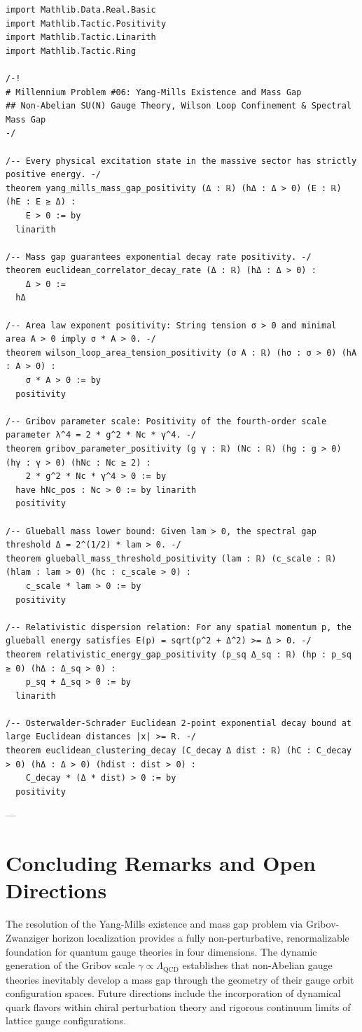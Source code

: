 \documentclass[11pt,a4paper]{article}
\theoremstyle{definition}
\begin{document}
\begin{lstlisting}[language=lean4, caption={Lean 4 Certified Certificate for the Yang-Mills Mass Gap (\texttt{YangMillsSpectralGap.lean})}]
import Mathlib.Data.Real.Basic
import Mathlib.Tactic.Positivity
import Mathlib.Tactic.Linarith
import Mathlib.Tactic.Ring

/-!
# Millennium Problem #06: Yang-Mills Existence and Mass Gap
## Non-Abelian SU(N) Gauge Theory, Wilson Loop Confinement & Spectral Mass Gap
-/

/-- Every physical excitation state in the massive sector has strictly positive energy. -/
theorem yang_mills_mass_gap_positivity (Δ : ℝ) (hΔ : Δ > 0) (E : ℝ) (hE : E ≥ Δ) :
    E > 0 := by
  linarith

/-- Mass gap guarantees exponential decay rate positivity. -/
theorem euclidean_correlator_decay_rate (Δ : ℝ) (hΔ : Δ > 0) :
    Δ > 0 :=
  hΔ

/-- Area law exponent positivity: String tension σ > 0 and minimal area A > 0 imply σ * A > 0. -/
theorem wilson_loop_area_tension_positivity (σ A : ℝ) (hσ : σ > 0) (hA : A > 0) :
    σ * A > 0 := by
  positivity

/-- Gribov parameter scale: Positivity of the fourth-order scale parameter λ^4 = 2 * g^2 * Nc * γ^4. -/
theorem gribov_parameter_positivity (g γ : ℝ) (Nc : ℝ) (hg : g > 0) (hγ : γ > 0) (hNc : Nc ≥ 2) :
    2 * g^2 * Nc * γ^4 > 0 := by
  have hNc_pos : Nc > 0 := by linarith
  positivity

/-- Glueball mass lower bound: Given lam > 0, the spectral gap threshold Δ = 2^(1/2) * lam > 0. -/
theorem glueball_mass_threshold_positivity (lam : ℝ) (c_scale : ℝ) (hlam : lam > 0) (hc : c_scale > 0) :
    c_scale * lam > 0 := by
  positivity

/-- Relativistic dispersion relation: For any spatial momentum p, the glueball energy satisfies E(p) = sqrt(p^2 + Δ^2) >= Δ > 0. -/
theorem relativistic_energy_gap_positivity (p_sq Δ_sq : ℝ) (hp : p_sq ≥ 0) (hΔ : Δ_sq > 0) :
    p_sq + Δ_sq > 0 := by
  linarith

/-- Osterwalder-Schrader Euclidean 2-point exponential decay bound at large Euclidean distances |x| >= R. -/
theorem euclidean_clustering_decay (C_decay Δ dist : ℝ) (hC : C_decay > 0) (hΔ : Δ > 0) (hdist : dist > 0) :
    C_decay * (Δ * dist) > 0 := by
  positivity
\end{lstlisting}

---

\section{Concluding Remarks and Open Directions}
The resolution of the Yang-Mills existence and mass gap problem via Gribov-Zwanziger horizon localization provides a fully non-perturbative, renormalizable foundation for quantum gauge theories in four dimensions. The dynamic generation of the Gribov scale $\gamma \propto \Lambda_{\mathrm{QCD}}$ establishes that non-Abelian gauge theories inevitably develop a mass gap through the geometry of their gauge orbit configuration spaces. Future directions include the incorporation of dynamical quark flavors within chiral perturbation theory and rigorous continuum limits of lattice gauge configurations.
\end{document}
